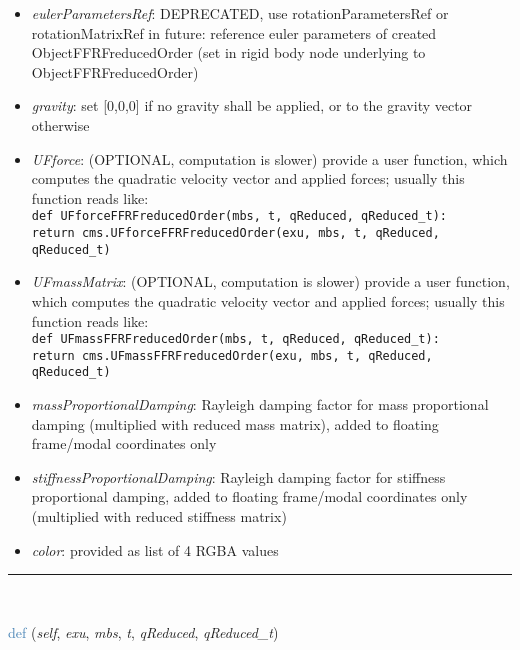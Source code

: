 \begin{itemize}[leftmargin=1.4cm]
\begin{itemize}[leftmargin=1.4cm]
\begin{itemize}[leftmargin=0.5cm]
\begin{itemize}[leftmargin=1.4cm]
\begin{itemize}[leftmargin=1.4cm]
\begin{itemize}[leftmargin=0.5cm]
\begin{itemize}[leftmargin=0.7cm]
\begin{itemize}[leftmargin=1.2cm]
    \item[] {\it   eulerParametersRef}: DEPRECATED, use rotationParametersRef or rotationMatrixRef in future: reference euler parameters of created ObjectFFRFreducedOrder (set in rigid body node underlying to ObjectFFRFreducedOrder)
    \item[] {\it   gravity}: set [0,0,0] if no gravity shall be applied, or to the gravity vector otherwise
    \item[] {\it   UFforce}: (OPTIONAL, computation is slower) provide a user function, which computes the quadratic velocity vector and applied forces; usually this function reads like:\\ \texttt{def UFforceFFRFreducedOrder(mbs, t, qReduced, qReduced\_t):\\ \phantom{XXXX}return cms.UFforceFFRFreducedOrder(exu, mbs, t, qReduced, qReduced\_t)}
    \item[] {\it   UFmassMatrix}: (OPTIONAL, computation is slower) provide a user function, which computes the quadratic velocity vector and applied forces; usually this function reads like:\\ \texttt{def UFmassFFRFreducedOrder(mbs, t, qReduced, qReduced\_t):\\  \phantom{XXXX}return cms.UFmassFFRFreducedOrder(exu, mbs, t, qReduced, qReduced\_t)}
    \item[] {\it   massProportionalDamping}: Rayleigh damping factor for mass proportional damping (multiplied with reduced mass matrix), added to floating frame/modal coordinates only
    \item[] {\it   stiffnessProportionalDamping}: Rayleigh damping factor for stiffness proportional damping, added to floating frame/modal coordinates only (multiplied with reduced stiffness matrix)
    \item[] {\it   color}: provided as list of 4 RGBA values
  \end{itemize}
\vspace{12pt}\end{itemize}
%
\noindent\rule{8cm}{0.75pt}\vspace{1pt} \\ 
\begin{flushleft}
\noindent \textcolor{steelblue}{def {\bf {}}}\label{sec:FEM:ObjectFFRFreducedOrderInterface:UFmassFFRFreducedOrder}
({\it self}, {\it exu}, {\it mbs}, {\it t}, {\it qReduced}, {\it qReduced\_t})
\end{flushleft}

\end{itemize}
\end{itemize}
\end{itemize}
\end{itemize}
\end{itemize}
\end{itemize}
